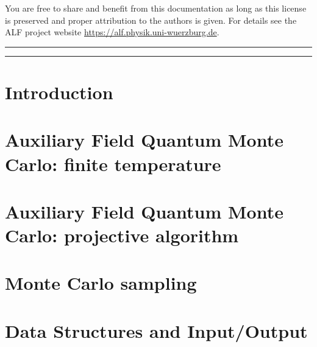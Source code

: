 \documentclass[submission, Phys]{SciPost}
\begin{document}

You are free to share and benefit from this documentation as long as this license is preserved
and proper attribution to the authors is given. For details see the ALF project
website \url{https://alf.physik.uni-wuerzburg.de}.

\vspace{10pt}
\noindent\rule{\textwidth}{1pt}
\tableofcontents\thispagestyle{fancy}
\noindent\rule{\textwidth}{1pt}
\vspace{10pt}

\section{Introduction}\label{sec:intro}

\section{Auxiliary Field Quantum Monte Carlo: finite temperature}\label{sec:def}




\section{Auxiliary Field Quantum Monte Carlo: projective algorithm}\label{sec:defT0}

\section{Monte Carlo sampling}\label{sec:sampling}

\section{Data Structures and Input/Output}\label{sec:imp}


\end{document}
